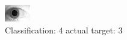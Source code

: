 \begin{figure}[h!]
\begin{center}
\includegraphics[width=0.60\columnwidth]{figures/ID1977_class_4_target_3.png}
\end{center}
\caption{ Classification: 4 actual target: 3}
\label{fig:ID1977_class_4_target_3}
\end{figure}

